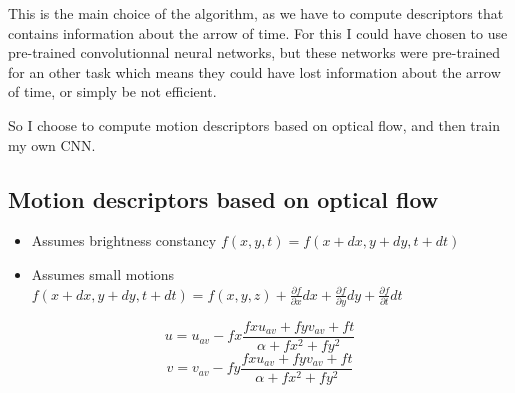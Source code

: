 \documentclass[10pt,a4paper]{report}
\begin{document}
		This is the main choice of the algorithm, as we have to compute descriptors that contains information about the arrow of time. For this I could have chosen to use pre-trained convolutionnal neural networks, but these networks were pre-trained for an other task which means they could have lost information about the arrow of time, or simply be not efficient.
		
		So I choose to compute motion descriptors based on optical flow, and then train my own CNN.  
		
		\subsection*{Motion descriptors based on optical flow}
		
		
		
		\begin{itemize}
			\item Assumes brightness constancy $f(x,y,t) = f(x+dx, y+dy, t+dt)$
			\item Assumes small motions $f(x+dx,y+dy,t+dt) = f(x,y,z) + \frac{\partial f}{\partial x}dx + \frac{\partial f}{\partial y}dy + \frac{\partial f}{\partial t}dt$
		\end{itemize}
		
		\[u = u_{av} - fx\frac{fx u_{av} + fy v_{av} + ft}{\alpha + fx^2 + fy^2}\]
		\[v = v_{av} - fy\frac{fx u_{av} + fy v_{av} + ft}{\alpha + fx^2 + fy^2}\]
		
\end{document}
